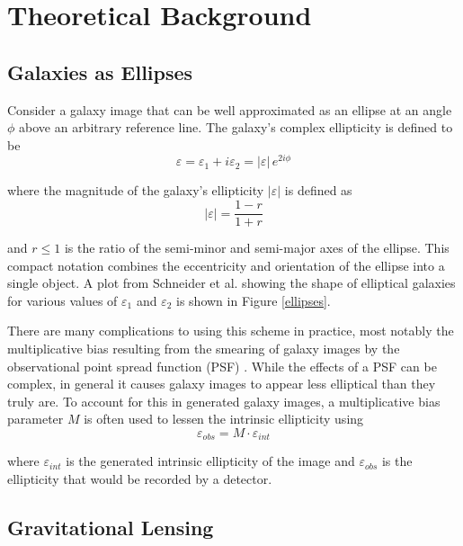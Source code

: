 \documentclass[%
 reprint,
 amsmath,amssymb,
 aps,nofootinbib
]{revtex4-1}
\begin{document}
\section{Theoretical Background}

\subsection*{Galaxies as Ellipses}
Consider a galaxy image that can be well approximated as an ellipse at an angle $\phi$ above an arbitrary reference line. The galaxy's complex ellipticity is defined to be 
\begin{equation}\label{complex_ellipticity}
\varepsilon=\varepsilon_1+i\varepsilon_2=|\varepsilon|\,e^{2i\phi}
\end{equation}

\noindent where the magnitude of the galaxy's ellipticity $|\varepsilon|$ is defined as
\begin{equation}
|\varepsilon|=\frac{1-r}{1+r}
\end{equation}

\noindent and $r\leq1$ is the ratio of the semi-minor and semi-major axes of the ellipse. This compact notation combines the eccentricity and orientation of the ellipse into a single object. A plot from Schneider et al. \cite{schneider} showing the shape of elliptical galaxies for various values of $\varepsilon_1$ and $\varepsilon_2$ is shown in Figure \ref{ellipses}.

There are many complications to using this scheme in practice, most notably the multiplicative bias resulting from the smearing of galaxy images by the observational point spread function (PSF) \cite{multiplicative_bias}. While the effects of a PSF can be complex, in general it causes galaxy images to appear less elliptical than they truly are. To account for this in generated galaxy images, a multiplicative bias parameter $M$ is often used to lessen the intrinsic ellipticity using
$$\varepsilon_{obs}=M\cdot\varepsilon_{int}$$

\noindent where $\varepsilon_{int}$ is the generated intrinsic ellipticity of the image and $\varepsilon_{obs}$ is the ellipticity that would be recorded by a detector.

\subsection*{Gravitational Lensing}
\end{document}
